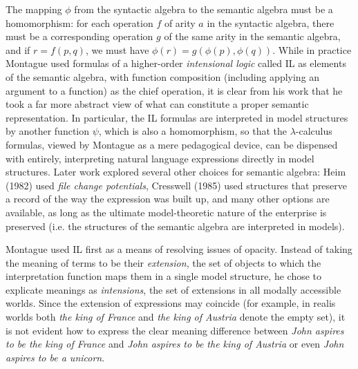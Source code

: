 The mapping $\phi$ from the syntactic algebra to the semantic algebra must be
a homomorphism: for each operation $f$ of arity $a$ in the syntactic algebra,
there must be a corresponding operation $g$ of the same arity in the semantic
algebra, and if $r = f(p,q)$, we must have $\phi(r)=g(\phi(p),\phi(q))$. While
in practice Montague used formulas of a higher-order {\it intensional logic}
called IL as elements of the semantic algebra, with function composition
(including applying an argument to a function) as the chief operation, it is
clear from his work that he took a far more abstract view of what can
constitute a proper semantic representation. In particular, the IL formulas
are interpreted in model structures by another function $\psi$, which is also
a homomorphism, so that the $\lambda$-calculus formulas, viewed by Montague as
a mere pedagogical device, can be dispensed with entirely, interpreting
natural language expressions directly in model structures. Later work explored
several other choices for semantic algebra: Heim (1982) \nocite{Heim:1982}
used {\it file change potentials}, Cresswell (1985) \nocite{Cresswell:1985}
used structures that preserve a record of the way the expression was built up,
and many other options are available, as long as the ultimate model-theoretic
nature of the enterprise is preserved (i.e. the structures of the semantic
algebra are interpreted in models).

Montague used IL first as a means of resolving issues of opacity. Instead of
taking the meaning of terms to be their {\it extension}, the set of objects to
which the interpretation function maps them in a single model structure, he
chose to explicate meanings as {\it intensions}, the set of extensions in all
modally accessible worlds. Since the
extension of expressions may coincide (for example, in realis worlds both {\it
  the king of France} and {\it the king of Austria} denote the empty set), it
is not evident how to express the clear meaning difference between {\it John
  aspires to be the king of France} and {\it John aspires to be the king of
  Austria} or even {\it John aspires to be a unicorn}.

